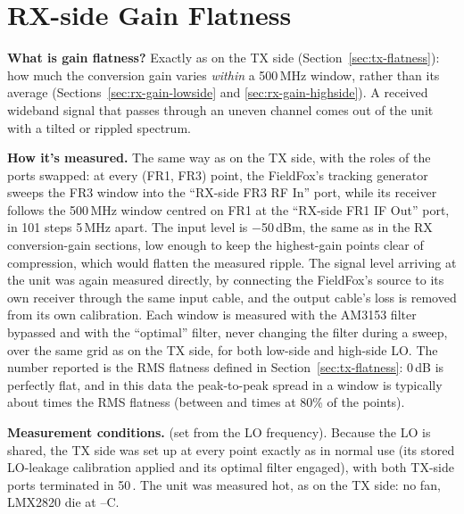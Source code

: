 \clearpage
\section{RX-side Gain Flatness}
\label{sec:rx-flatness}
\raggedbottom%

\textbf{What is gain flatness?} Exactly as on the TX side (Section~\ref{sec:tx-flatness}): how much the conversion
gain varies \emph{within} a 500\,MHz window, rather than its average (Sections~\ref{sec:rx-gain-lowside} and
\ref{sec:rx-gain-highside}). A received wideband signal that passes through an uneven channel comes out of the unit
with a tilted or rippled spectrum.

\textbf{How it's measured.} The same way as on the TX side, with the roles of the ports swapped: at every (FR1, FR3)
point, the FieldFox's tracking generator sweeps the FR3 window into the ``RX-side FR3 RF In'' port, while its
receiver follows the 500\,MHz window centred on FR1 at the ``RX-side FR1 IF Out'' port, in 101 steps 5\,MHz apart.
The input level is −50\,dBm, the same as in the RX conversion-gain sections, low enough to keep the highest-gain
points clear of compression, which would flatten the measured ripple. The signal level arriving at the
unit was again measured directly, by connecting the FieldFox's source to its own receiver through the same input
cable, and the output cable's loss is removed from its own calibration. Each window is measured with the AM3153
filter bypassed and with the ``optimal'' filter, never changing the filter during a sweep, over the same grid as on
the TX side, for both low-side and high-side LO. The number reported is the RMS flatness defined in
Section~\ref{sec:tx-flatness}: 0\,dB is perfectly flat, and in this data the peak-to-peak spread in a window is
typically about \flatRxPpRatio{} times the RMS flatness (between \flatRxPpRatioLow{} and \flatRxPpRatioHigh{} times
at 80\% of the points).

\textbf{Measurement conditions.} \lmxDriveRule{} (set from the LO frequency). Because the LO is shared, the TX side was set up at every point exactly as in normal use (its stored LO-leakage calibration applied and its optimal filter engaged), with both TX-side ports terminated in 50\,\textohm. The unit was measured hot, as on the TX side: no fan, LMX2820 die at \condRxFlatMinC--\condRxFlatMaxC\textdegree C.

